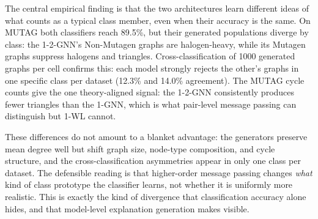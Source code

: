 \documentclass[12pt,a4paper]{article}
\begin{document}
The central empirical finding is that the two architectures learn different ideas of what counts as a typical class member, even when their accuracy is the same. On MUTAG both classifiers reach 89.5\%, but their generated populations diverge by class: the 1-2-GNN's Non-Mutagen graphs are halogen-heavy, while its Mutagen graphs suppress halogens and triangles. Cross-classification of 1000 generated graphs per cell confirms this: each model strongly rejects the other's graphs in one specific class per dataset (12.3\% and 14.0\% agreement). The MUTAG cycle counts give the one theory-aligned signal: the 1-2-GNN consistently produces fewer triangles than the 1-GNN, which is what pair-level message passing can distinguish but 1-WL cannot.

These differences do not amount to a blanket advantage: the generators preserve mean degree well but shift graph size, node-type composition, and cycle structure, and the cross-classification asymmetries appear in only one class per dataset. The defensible reading is that higher-order message passing changes \emph{what} kind of class prototype the classifier learns, not whether it is uniformly more realistic. This is exactly the kind of divergence that classification accuracy alone hides, and that model-level explanation generation makes visible.
\end{document}
